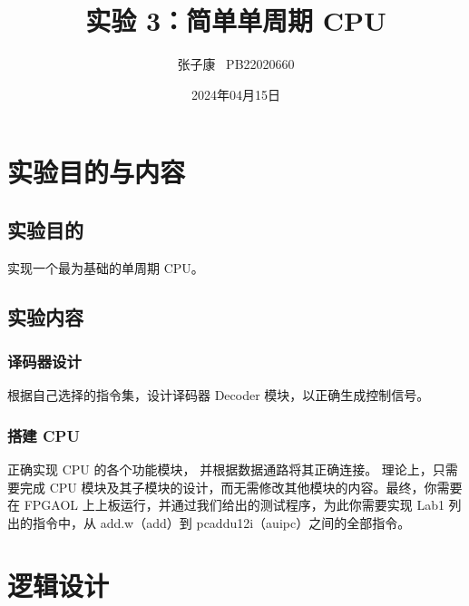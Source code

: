 \documentclass[12pt,a4paper]{ctexart}
\title{实验 3：简单单周期 CPU}
\author{张子康 \ PB22020660}
\date{2024年04月15日}
\begin{document}
\maketitle
\newpage
\section{实验目的与内容}
\subsection{实验目的}
实现一个最为基础的单周期 CPU。
\subsection{实验内容}
\subsubsection{译码器设计}
根据自己选择的指令集，设计译码器 Decoder 模块，以正确生成控制信号。
\subsubsection{搭建 CPU}
正确实现 CPU 的各个功能模块，
并根据数据通路将其正确连接。
理论上，只需要完成 CPU 模块及其子模块的设计，而无需修改其他模块的内容。最终，你需要在 FPGAOL 上上板运行，并通过我们给出的测试程序，为此你需要实现 Lab1 列出的指令中，从 add.w（add）到 pcaddu12i（auipc）之间的全部指令。
\section{逻辑设计}
\end{document}
